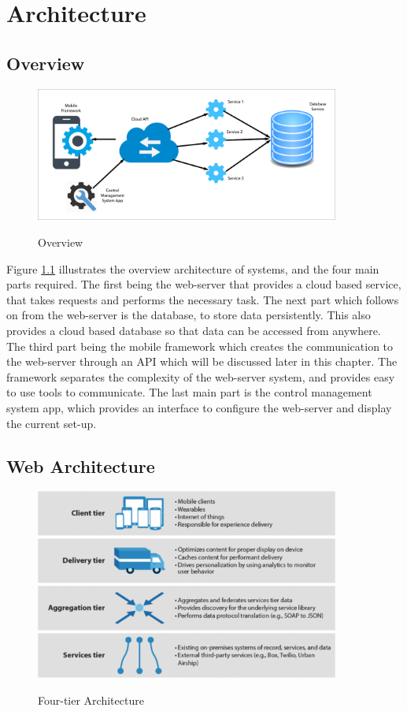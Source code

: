 \chapter{Architecture}

\section{Overview}

\begin{figure}[h]
    \caption{Overview}
    \centering
    \includegraphics[width=100mm]{images/overview}
    \label{fig:label}
\end{figure}

Figure \ref{fig:label} illustrates the overview architecture of systems, and the four main parts required. The first being the web-server that provides a cloud based service, that takes requests and performs the necessary task. The next part which follows on from the web-server is the database, to store data persistently. This also provides a cloud based database so that data can be accessed from anywhere. The third part being the mobile framework which creates the communication to the web-server through an API which will be discussed later in this chapter. The framework separates the complexity of the web-server system, and provides easy to use tools to communicate. The last main part is the control management system app, which provides an interface to configure the web-server and display the current set-up.

\section{Web Architecture}

\begin{figure}[!h]
    \caption{Four-tier Architecture \cite{ted} }
    \centering
    \includegraphics[width=100mm]{images/four-tier}
    \label{fig:four-tier}
\end{figure}

